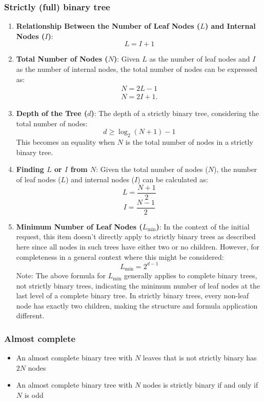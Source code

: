 \documentclass{report}
\begin{document}
    \subsubsection{Strictly (full) binary tree}
    \bigbreak \noindent 
    \begin{enumerate}
        \item \textbf{Relationship Between the Number of Leaf Nodes (\(L\)) and Internal Nodes (\(I\))}:
            \[L = I + 1\]
        \item \textbf{Total Number of Nodes (\(N\))}:
            Given \(L\) as the number of leaf nodes and \(I\) as the number of internal nodes, the total number of nodes can be expressed as:
            \begin{align*}
                N = 2L -1 \\
                N = 2I + 1
            .\end{align*}
        \item \textbf{Depth of the Tree (\(d\))}:
            The depth of a strictly binary tree, considering the total number of nodes:
            \[d \geq \log_2(N+1) - 1\]
            This becomes an equality when \(N\) is the total number of nodes in a strictly binary tree.

        \item \textbf{Finding \(L\) or \(I\) from \(N\)}:
            Given the total number of nodes (\(N\)), the number of leaf nodes (\(L\)) and internal nodes (\(I\)) can be calculated as:
            \[L = \frac{N + 1}{2}\]
            \[I = \frac{N - 1}{2}\]

        \item \textbf{Minimum Number of Leaf Nodes (\(L_{\text{min}}\))}:
            In the context of the initial request, this item doesn't directly apply to strictly binary trees as described here since all nodes in such trees have either two or no children. However, for completeness in a general context where this might be considered:
            \[L_{\text{min}} = 2^{d-1}\]
            Note: The above formula for \(L_{\text{min}}\) generally applies to complete binary trees, not strictly binary trees, indicating the minimum number of leaf nodes at the last level of a complete binary tree. In strictly binary trees, every non-leaf node has exactly two children, making the structure and formula application different.
    \end{enumerate}
    
    \bigbreak \noindent 
    \subsubsection{Almost complete }
    \begin{itemize}
        \item An almost complete binary tree with $N$ leaves that is not strictly binary has $2N$ nodes
        \item An almost complete binary tree with $N$ nodes is strictly binary if and only if $N$ is odd
    \end{itemize}
\end{document}
